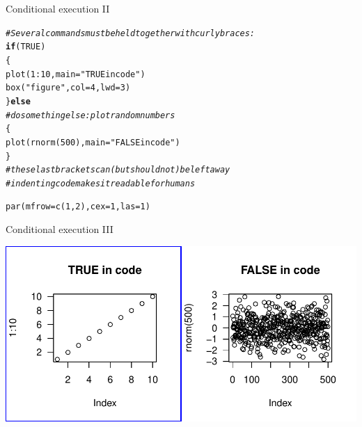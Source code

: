 \documentclass[xcolor=table,      handout ,    xcolor=dvipsnames]{beamer}\usepackage[]{graphicx}\usepackage[]{color}
\makeatletter
\newcommand{\hlnum}[1]{\textcolor[rgb]{0,0,0}{#1}}
\newcommand{\hlstr}[1]{\textcolor[rgb]{0.545,0.137,0.137}{#1}}
\newcommand{\hlcom}[1]{\textcolor[rgb]{0,0.392,0}{\textit{#1}}}
\newcommand{\hlopt}[1]{\textcolor[rgb]{0,0,0}{#1}}
\newcommand{\hlstd}[1]{\textcolor[rgb]{0,0,0}{#1}}
\newcommand{\hlkwa}[1]{\textcolor[rgb]{1,0,0}{\textbf{#1}}}
\newcommand{\hlkwc}[1]{\textcolor[rgb]{1,0,1}{#1}}
\newcommand{\hlkwd}[1]{\textcolor[rgb]{0,0,1}{#1}}
\newenvironment{kframe}{%
 \def\at@end@of@kframe{}%
 \ifinner\ifhmode%
  \def\at@end@of@kframe{\end{minipage}}%
  \begin{minipage}{\columnwidth}%
 \fi\fi%
 \def\FrameCommand##1{\hskip\@totalleftmargin \hskip-\fboxsep
 \colorbox{shadecolor}{##1}\hskip-\fboxsep
     \hskip-\linewidth \hskip-\@totalleftmargin \hskip\columnwidth}%
 \MakeFramed {\advance\hsize-\width
   \@totalleftmargin\z@ \linewidth\hsize
   \@setminipage}}%
 {\par\unskip\endMakeFramed%
 \at@end@of@kframe}
\newenvironment{knitrout}{}{} %
\makeatother
\begin{document}

\begin{frame}[fragile]{Conditional execution II}
\begin{knitrout}
\color{fgcolor}\begin{kframe}
\begin{alltt}
\hlcom{# Several commands must be held together with curly braces:}
\hlkwa{if}\hlstd{(}\hlnum{TRUE}\hlstd{)}
  \hlstd{\{}
  \hlkwd{plot}\hlstd{(}\hlnum{1}\hlopt{:}\hlnum{10}\hlstd{,} \hlkwc{main}\hlstd{=}\hlstr{"TRUE in code"}\hlstd{)}
  \hlkwd{box}\hlstd{(}\hlstr{"figure"}\hlstd{,} \hlkwc{col}\hlstd{=}\hlnum{4}\hlstd{,} \hlkwc{lwd}\hlstd{=}\hlnum{3}\hlstd{)}
  \hlstd{\}} \hlkwa{else}
\hlcom{# do something else: plot random numbers}
    \hlstd{\{}
    \hlkwd{plot}\hlstd{(}\hlkwd{rnorm}\hlstd{(}\hlnum{500}\hlstd{),} \hlkwc{main}\hlstd{=}\hlstr{"FALSE in code"}\hlstd{)}
    \hlstd{\}}
\hlcom{# these last brackets can (but should not) be left away}
\hlcom{# indenting code makes it readable for humans}

\hlkwd{par}\hlstd{(}\hlkwc{mfrow}\hlstd{=}\hlkwd{c}\hlstd{(}\hlnum{1}\hlstd{,}\hlnum{2}\hlstd{),} \hlkwc{cex}\hlstd{=}\hlnum{1}\hlstd{,} \hlkwc{las}\hlstd{=}\hlnum{1}\hlstd{)}
\end{alltt}
\end{kframe}
\end{knitrout}
\end{frame}


\begin{frame}[fragile]{Conditional execution III}
\begin{knitrout}
\color{fgcolor}

{\centering \includegraphics[width=\textwidth]{./fig/cond3-1} 

}



\end{knitrout}
\end{frame}
\end{document}
